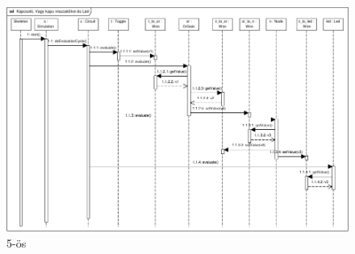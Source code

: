 \begin{figure}[H]
\begin{center}
\includegraphics[angle=90,width=15cm]{chapters/chapter05/imgs/test5.pdf}
\caption{5-ös}
\label{fig:init}
\end{center}
\end{figure}
